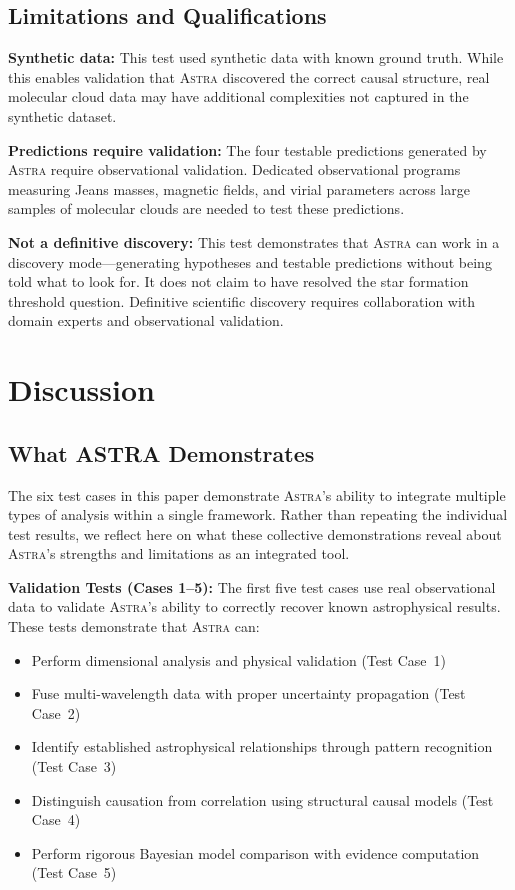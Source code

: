 \documentclass[fleqn,usenatbib]{mnras}
\newcommand{\astra}{\textsc{Astra}\xspace}
\begin{document}
\subsection{Limitations and Qualifications}
\label{sec:tc6:limitations}

\textbf{Synthetic data:}
This test used synthetic data with known ground truth.
While this enables validation that \astra discovered the correct causal structure, real molecular cloud data may have additional complexities not captured in the synthetic dataset.

\textbf{Predictions require validation:}
The four testable predictions generated by \astra require observational validation.
Dedicated observational programs measuring Jeans masses, magnetic fields, and virial parameters across large samples of molecular clouds are needed to test these predictions.

\textbf{Not a definitive discovery:}
This test demonstrates that \astra can work in a discovery mode---generating hypotheses and testable predictions without being told what to look for.
It does not claim to have resolved the star formation threshold question.
Definitive scientific discovery requires collaboration with domain experts and observational validation.

\section{Discussion}
\label{sec:discussion}

\subsection{What ASTRA Demonstrates}
\label{sec:discussion:demonstrates}

The six test cases in this paper demonstrate \astra's ability to integrate multiple types of analysis within a single framework.
Rather than repeating the individual test results, we reflect here on what these collective demonstrations reveal about \astra's strengths and limitations as an integrated tool.

\textbf{Validation Tests (Cases 1--5):}
The first five test cases use real observational data to validate \astra's ability to correctly recover known astrophysical results.
These tests demonstrate that \astra can:
\begin{itemize}
  \item Perform dimensional analysis and physical validation (Test Case~1)
  \item Fuse multi-wavelength data with proper uncertainty propagation (Test Case~2)
  \item Identify established astrophysical relationships through pattern recognition (Test Case~3)
  \item Distinguish causation from correlation using structural causal models (Test Case~4)
  \item Perform rigorous Bayesian model comparison with evidence computation (Test Case~5)
\end{itemize}
\end{document}
